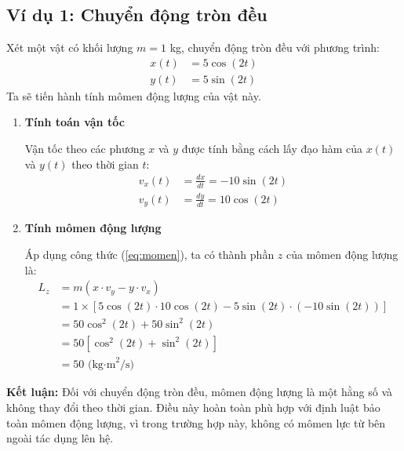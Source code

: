 \documentclass{report}
\begin{document}
\subsection{Ví dụ 1: Chuyển động tròn đều}
\justifying Xét một vật có khối lượng $m = 1$ kg, chuyển động tròn đều với phương trình:
\begin{align*}
x(t) &= 5\cos(2t)\\
y(t) &= 5\sin(2t)
\end{align*}
\justifying Ta sẽ tiến hành tính mômen động lượng của vật này.
\begin{enumerate}[label=\textbf{Bước \arabic*:}, leftmargin=2cm, itemsep=5pt]
    \item \textbf{Tính toán vận tốc}
    
    \justifying Vận tốc theo các phương $x$ và $y$ được tính bằng cách lấy đạo hàm của $x(t)$ và $y(t)$ theo thời gian $t$:
    \begin{align*}
    v_x(t) &= \frac{dx}{dt} = -10\sin(2t)\\
    v_y(t) &= \frac{dy}{dt} = 10\cos(2t)
    \end{align*}

    \item \textbf{Tính mômen động lượng}
    
    \justifying Áp dụng công thức (\ref{eq:momen}), ta có thành phần $z$ của mômen động lượng là:
    \begin{align*}
    L_z &= m(x \cdot v_y - y \cdot v_x)\\
    &= 1 \times [5\cos(2t) \cdot 10\cos(2t) - 5\sin(2t) \cdot (-10\sin(2t))]\\
    &= 50\cos^2(2t) + 50\sin^2(2t)\\
    &= 50[\cos^2(2t) + \sin^2(2t)]\\
    &= 50 \text{ (kg·m}^2\text{/s)}
    \end{align*}
\end{enumerate}
\textbf{Kết luận:} \justifying Đối với chuyển động tròn đều, mômen động lượng là một hằng số và không thay đổi theo thời gian. Điều này hoàn toàn phù hợp với định luật bảo toàn mômen động lượng, vì trong trường hợp này, không có mômen lực từ bên ngoài tác dụng lên hệ.
\end{document}

